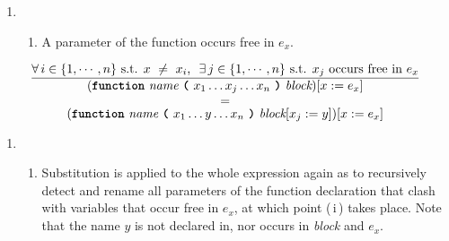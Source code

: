 \vspace{3mm}
\begin{enumerate}
    \item[]
    \begin{enumerate}[label=(\,\roman*\,), start=2]
        \item A parameter of the function occurs free in $e_x$.
    \end{enumerate}
\end{enumerate}
        \[
        \frac{
          \forall \, i \in \{1, \cdots, n\} \text{ s.t. } x \ \neq \ x_i \text{, } \ \exists \, j \in \{1, \cdots, n\} \text{ s.t. } x_j \text{ occurs free in $e_x$}
        }{
          \substack{\substack{\displaystyle{(\textbf{\texttt{function}}\  \textit{name} \ \textbf{\texttt{(}}\ x_1 \ldots x_j \ldots x_n \ \textbf{\texttt{)}}\ \textit{block})[x := e_x]} \vspace{1.5mm} \\ \vspace{0.5mm} \displaystyle{=}} \\  \displaystyle{(\textbf{\texttt{function}}\  \textit{name} \ \textbf{\texttt{(}}\ x_1 \ldots y \ldots x_n \ \textbf{\texttt{)}}\ \textit{block}[x_j := y])[x := e_x]}}
        }
        \]

\begin{enumerate}
    \item[]
    \begin{enumerate}[label=\roman*., start=2]
        \item[]
        \vspace{3mm}
        Substitution is applied to the whole expression again as to recursively detect and rename all parameters of the function declaration that clash with variables that occur free in $e_x$, at which point (\,i\,) takes place. Note that the name $y$ is not declared in, nor occurs in \textit{block} and $e_x$.
    \end{enumerate}
\end{enumerate}

